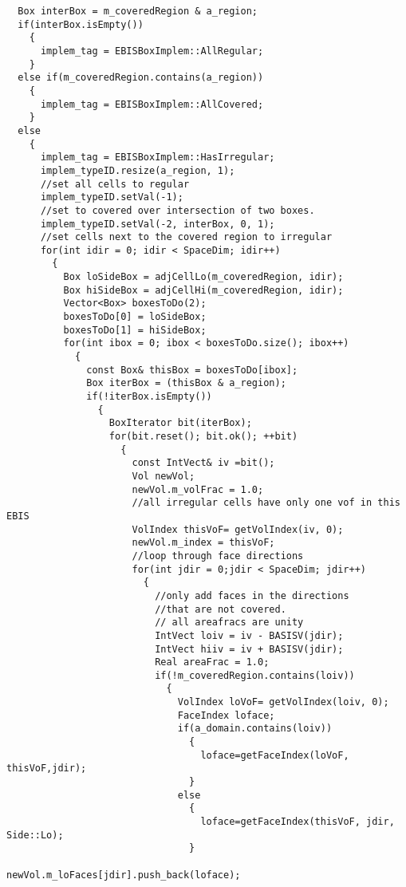 \begin{small}
\begin{verbatim}
  Box interBox = m_coveredRegion & a_region;
  if(interBox.isEmpty())
    {
      implem_tag = EBISBoxImplem::AllRegular;
    }
  else if(m_coveredRegion.contains(a_region))
    {
      implem_tag = EBISBoxImplem::AllCovered;
    }
  else
    {
      implem_tag = EBISBoxImplem::HasIrregular;
      implem_typeID.resize(a_region, 1);
      //set all cells to regular 
      implem_typeID.setVal(-1);
      //set to covered over intersection of two boxes.
      implem_typeID.setVal(-2, interBox, 0, 1);
      //set cells next to the covered region to irregular
      for(int idir = 0; idir < SpaceDim; idir++)
        {
          Box loSideBox = adjCellLo(m_coveredRegion, idir);
          Box hiSideBox = adjCellHi(m_coveredRegion, idir);
          Vector<Box> boxesToDo(2);
          boxesToDo[0] = loSideBox;
          boxesToDo[1] = hiSideBox;
          for(int ibox = 0; ibox < boxesToDo.size(); ibox++)
            {
              const Box& thisBox = boxesToDo[ibox];
              Box iterBox = (thisBox & a_region);
              if(!iterBox.isEmpty())
                {
                  BoxIterator bit(iterBox);
                  for(bit.reset(); bit.ok(); ++bit)
                    {
                      const IntVect& iv =bit();
                      Vol newVol;
                      newVol.m_volFrac = 1.0;
                      //all irregular cells have only one vof in this EBIS
                      VolIndex thisVoF= getVolIndex(iv, 0);
                      newVol.m_index = thisVoF;
                      //loop through face directions
                      for(int jdir = 0;jdir < SpaceDim; jdir++)
                        {
                          //only add faces in the directions
                          //that are not covered. 
                          // all areafracs are unity
                          IntVect loiv = iv - BASISV(jdir);
                          IntVect hiiv = iv + BASISV(jdir);
                          Real areaFrac = 1.0;
                          if(!m_coveredRegion.contains(loiv))
                            {
                              VolIndex loVoF= getVolIndex(loiv, 0);
                              FaceIndex loface;
                              if(a_domain.contains(loiv))
                                {
                                  loface=getFaceIndex(loVoF, thisVoF,jdir);
                                }
                              else
                                {
                                  loface=getFaceIndex(thisVoF, jdir, Side::Lo);
                                }
                              newVol.m_loFaces[jdir].push_back(loface);

\end{verbatim}
\end{small}

